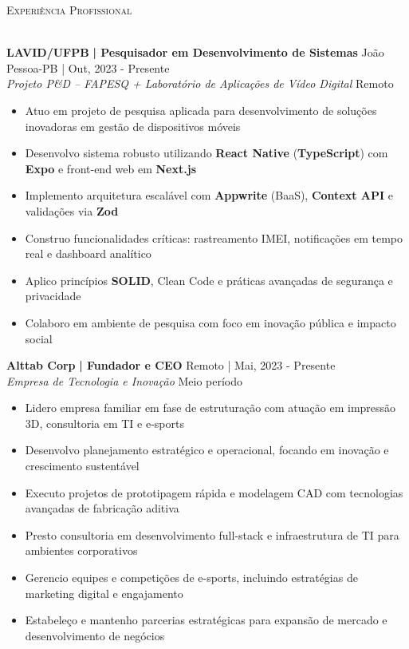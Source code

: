 \documentclass[a4paper]{article}
\newcommand{\lineunder}{
    \vspace*{-8pt} \\
    \hspace*{-18pt} \hrulefill \\
}
\newcommand{\header}[1]{
    {\hspace*{-18pt}\vspace*{6pt} \textsc{#1}}
    \vspace*{-6pt} \lineunder
}
\begin{document}
%
%
\header{Experiência Profissional}
\vspace{2mm}

\textbf{LAVID/UFPB}\textbf{ | Pesquisador em Desenvolvimento de Sistemas} \hfill João Pessoa-PB | Out, 2023 - Presente\\
\textit{Projeto P\&D – FAPESQ + Laboratório de Aplicações de Vídeo Digital} \hfill Remoto\\
\vspace{-3mm}
\begin{itemize} \itemsep -3pt
    \item Atuo em projeto de pesquisa aplicada para desenvolvimento de soluções inovadoras em gestão de dispositivos móveis
    \item Desenvolvo sistema robusto utilizando \textbf{React Native} (\textbf{TypeScript}) com \textbf{Expo} e front-end web em \textbf{Next.js}
    \item Implemento arquitetura escalável com \textbf{Appwrite} (BaaS), \textbf{Context API} e validações via \textbf{Zod}
    \item Construo funcionalidades críticas: rastreamento IMEI, notificações em tempo real e dashboard analítico
    \item Aplico princípios \textbf{SOLID}, Clean Code e práticas avançadas de segurança e privacidade
    \item Colaboro em ambiente de pesquisa com foco em inovação pública e impacto social
\end{itemize}

\textbf{Alttab Corp}\textbf{ | Fundador e CEO} \hfill Remoto | Mai, 2023 - Presente\\
\textit{Empresa de Tecnologia e Inovação} \hfill Meio período\\
\vspace{-3mm}
\begin{itemize} \itemsep -3pt
    \item Lidero empresa familiar em fase de estruturação com atuação em impressão 3D, consultoria em TI e e-sports
    \item Desenvolvo planejamento estratégico e operacional, focando em inovação e crescimento sustentável
    \item Executo projetos de prototipagem rápida e modelagem CAD com tecnologias avançadas de fabricação aditiva
    \item Presto consultoria em desenvolvimento full-stack e infraestrutura de TI para ambientes corporativos
    \item Gerencio equipes e competições de e-sports, incluindo estratégias de marketing digital e engajamento
    \item Estabeleço e mantenho parcerias estratégicas para expansão de mercado e desenvolvimento de negócios
\end{itemize}
\end{document}

